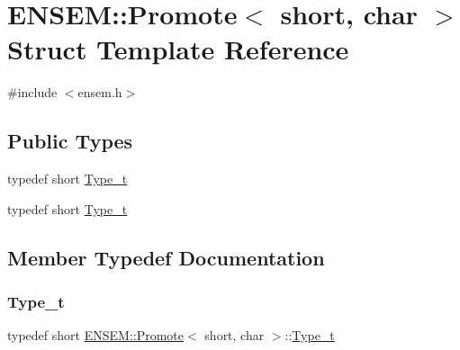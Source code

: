 \hypertarget{structENSEM_1_1Promote_3_01short_00_01char_01_4}{}\section{E\+N\+S\+EM\+:\+:Promote$<$ short, char $>$ Struct Template Reference}
\label{structENSEM_1_1Promote_3_01short_00_01char_01_4}


{\ttfamily \#include $<$ensem.\+h$>$}

\subsection*{Public Types}
\begin{DoxyCompactItemize}
\item 
typedef short \mbox{\hyperlink{structENSEM_1_1Promote_3_01short_00_01char_01_4_a17ccbda3b4c4ad881634810abd3eb2dc}{Type\+\_\+t}}
\item 
typedef short \mbox{\hyperlink{structENSEM_1_1Promote_3_01short_00_01char_01_4_a17ccbda3b4c4ad881634810abd3eb2dc}{Type\+\_\+t}}
\end{DoxyCompactItemize}


\subsection{Member Typedef Documentation}
\mbox{\label{structENSEM_1_1Promote_3_01short_00_01char_01_4_a17ccbda3b4c4ad881634810abd3eb2dc}} 
\subsubsection{\texorpdfstring{Type\_t}{Type\_t}\hspace{0.1cm}{\footnotesize\ttfamily [1/2]}}
{\footnotesize\ttfamily typedef short \mbox{\hyperlink{structENSEM_1_1Promote}{E\+N\+S\+E\+M\+::\+Promote}}$<$ short, char $>$\+::\mbox{\hyperlink{structENSEM_1_1Promote_3_01short_00_01char_01_4_a17ccbda3b4c4ad881634810abd3eb2dc}{Type\+\_\+t}}}

\mbox{\label{structENSEM_1_1Promote_3_01short_00_01char_01_4_a17ccbda3b4c4ad881634810abd3eb2dc}} 
